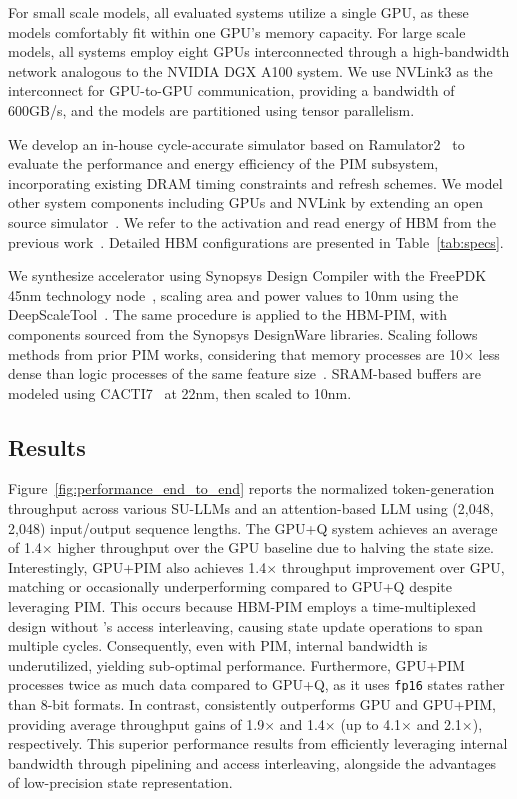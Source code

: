 %
For small scale models, all evaluated systems utilize a single GPU,
as these models comfortably fit within one GPU's memory capacity.
%
For large scale models, all systems employ eight GPUs interconnected
through a high-bandwidth network analogous to the NVIDIA DGX A100 system.
%
We use NVLink3 as the interconnect for GPU-to-GPU
communication, providing a bandwidth of 600GB/s, and the models are
partitioned using tensor parallelism.
%

%
%
We develop an in-house cycle-accurate simulator based on
Ramulator2~\cite{luo2023ramulator2} to evaluate the performance and
energy efficiency of the PIM subsystem, incorporating existing DRAM
timing constraints and refresh schemes.
%
We model other system components including GPUs and NVLink by
extending an open source simulator~\cite{park2024attacc}.
%
We refer to the activation and read energy of HBM from the previous
work~\cite{fine_grained_dram}.
%
Detailed HBM configurations are presented in Table~\ref{tab:specs}.
%

%
%
We synthesize \sysname{} accelerator using Synopsys Design Compiler
with the FreePDK 45nm technology node~\cite{freepdk}, scaling area
and power values to 10nm using the DeepScaleTool~\cite{9401196}.
%
The same procedure is applied to the HBM-PIM, with components sourced
from the Synopsys DesignWare libraries.
%
Scaling follows methods from prior PIM works, considering that memory
processes are 10$\times$ less dense than logic processes of the same
feature size~\cite{park2024attacc}.
%
SRAM-based buffers are modeled using CACTI7~\cite{cacti7} at 22nm,
then scaled to 10nm.
%



%
\subsection{Results}
\label{subsec:result}
%
Figure~\ref{fig:performance_end_to_end} reports the normalized
token-generation throughput across various SU-LLMs and an
attention-based LLM using (2,048, 2,048) input/output sequence lengths.
%
The GPU+Q system achieves an average of 1.4$\times$ higher
throughput over the GPU baseline due to halving the state size.
%
Interestingly, GPU+PIM also achieves 1.4$\times$
throughput improvement over GPU, matching or occasionally
underperforming compared to GPU+Q despite leveraging PIM.
%
This occurs because HBM-PIM employs a time-multiplexed design without
\sysname{}’s access interleaving, causing state update operations to
span multiple cycles.
%
Consequently, even with PIM, internal bandwidth is underutilized,
yielding sub-optimal performance.
%
Furthermore, GPU+PIM processes twice as much data compared to GPU+Q,
as it uses \texttt{fp16} states rather than 8-bit formats.
%
In contrast, \sysname{} consistently outperforms GPU and GPU+PIM,
providing average throughput gains of 1.9$\times$ and
1.4$\times$ (up to 4.1$\times$ and 2.1$\times$), respectively.
%
This superior performance results from efficiently leveraging
internal bandwidth through pipelining and access interleaving,
alongside the advantages of low-precision state representation.
%

